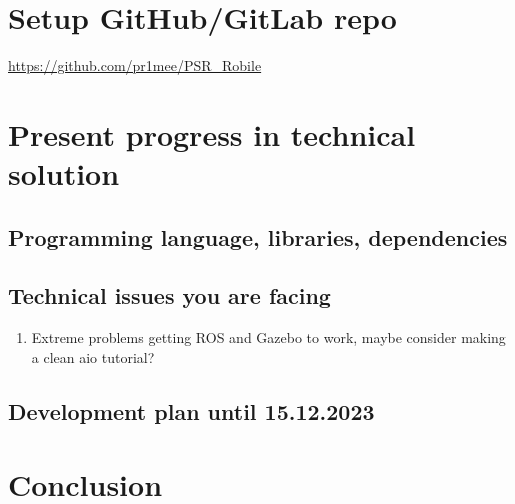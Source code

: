 \documentclass[11pt,a4paper]{article}
\begin{document}
\section{Setup GitHub/GitLab repo}
\url{https://github.com/pr1mee/PSR_Robile}

\section{Present progress in technical solution}

\subsection{Programming language, libraries, dependencies}
\subsection{Technical issues you are facing}
\begin {enumerate}
\item Extreme problems getting ROS and Gazebo to work, maybe consider making a clean aio tutorial?
\end{enumerate}
\subsection{Development plan until 15.12.2023}

\section{Conclusion}
% 
% 
\end{document}
